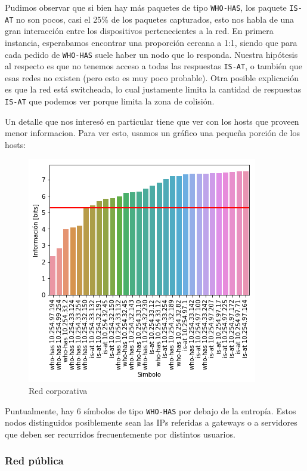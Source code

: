 Pudimos observar que si bien hay más paquetes de tipo \texttt{WHO-HAS}, los paquete \texttt{IS-AT} no son pocos, casi el 25\% de los paquetes capturados, esto nos habla de una gran interacción entre los dispositivos pertenecientes a la red. En primera instancia, esperabamos encontrar una proporción cercana a 1:1, siendo que para cada pedido de \texttt{WHO-HAS} suele haber un nodo que lo responda. Nuestra hipótesis al respecto es que no tenemos acceso a todas las respuestas \texttt{IS-AT}, o también que esas redes no existen (pero esto es muy poco probable). Otra posible explicación es que la red está switcheada, lo cual justamente limita la cantidad de respuestas \texttt{IS-AT} que podemos ver porque limita la zona de colisión.

Un detalle que nos interesó en particular tiene que ver con los hosts que proveen menor informacion. Para ver esto, usamos un gráfico una pequeña porción de los hosts:

\begin{figure}[H]
	\centering
	\includegraphics[width=.5\linewidth]{imagenes/despegar_hosts}
	\caption{Red corporativa}
\end{figure}

Puntualmente, hay 6 símbolos de tipo \texttt{WHO-HAS} por debajo de la entropía. Estos nodos distinguidos posiblemente sean las IPs referidas a gateways o a servidores que deben ser recurridos frecuentemente por distintos usuarios.


\subsubsection{Red pública}

